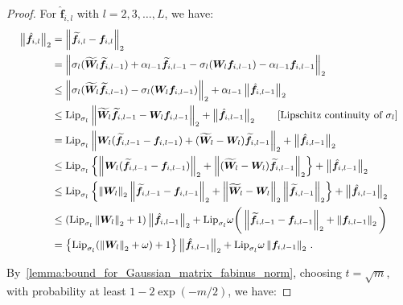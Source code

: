 \documentclass[nohyperref]{article}
\theoremstyle{plain}
\theoremstyle{definition}
\theoremstyle{remark}
\begin{document}
\begin{proof}
For $ \hat{\bm{f}}_{i,l}$ with $l=2,3,\dots,L$, we have:
\begin{equation}
\small
\begin{split}
\left \| \hat{\bm{f}}_{i,l} \right \| _2 & = \left \| \widetilde{\bm{f}}_{i,l} - \bm{f}_{i,l} \right \| _2\\
& = \left \| \sigma_{l}(\widetilde{\bm{W}}_l\widetilde{\bm{f}}_{i,l-1}) + \alpha_{l-1}\widetilde{\bm{f}}_{i,l-1} - \sigma_{l}(\bm{W}_l\bm{f}_{i,l-1})-\alpha_{l-1}\bm{f}_{i,l-1} \right \| _2\\
& \leq \left \| \sigma_{l}(\widetilde{\bm{W}}_l\widetilde{\bm{f}}_{i,l-1}) - \sigma_{l}(\bm{W}_l\bm{f}_{i,l-1}) \right \| _2 + \alpha_{l-1}\left \| \hat{\bm{f}}_{i,l-1} \right \| _2\\ & \leq \mathrm{Lip}_{\sigma_{l}}\left \| \widetilde{\bm{W}}_l\widetilde{\bm{f}}_{i,l-1} - \bm{W}_l\bm{f}_{i,l-1} \right \| _2 + \left \| \hat{\bm{f}}_{i,l-1} \right \| _2\quad\quad\text{[Lipschitz continuity of $\sigma_{l}$]}\\
& = \mathrm{Lip}_{\sigma_{l}}\left \| \bm{W}_l(\widetilde{\bm{f}}_{i,l-1} - \bm{f}_{i,l-1})+(\widetilde{\bm{W}}_l-\bm{W}_l)\widetilde{\bm{f}}_{i,l-1} \right \| _2 + \left \| \hat{\bm{f}}_{i,l-1} \right \| _2\\
& \leq \mathrm{Lip}_{\sigma_{l}}\left\{\left \| \bm{W}_l(\widetilde{\bm{f}}_{i,l-1} - \bm{f}_{i,l-1})\right \| _2+\left \| (\widetilde{\bm{W}}_l-\bm{W}_l)\widetilde{\bm{f}}_{i,l-1} \right \| _2\right\} + \left \| \hat{\bm{f}}_{i,l-1} \right \| _2\\ & \leq \mathrm{Lip}_{\sigma_{l}}\left\{\left \| \bm{W}_l\right \| _2 \left \|\widetilde{\bm{f}}_{i,l-1} - \bm{f}_{i,l-1}\right \|_2+\left \| \widetilde{\bm{W}}_l-\bm{W}_l\right \| _2 \left \|\widetilde{\bm{f}}_{i,l-1} \right \| _2\right\} + \left \| \hat{\bm{f}}_{i,l-1} \right \| _2\\& \leq (\mathrm{Lip}_{\sigma_{l}}\left \| \bm{W}_l\right \| _2+1) \left \|\hat{\bm{f}}_{i,l-1}\right \|_2+\mathrm{Lip}_{\sigma_{l}}\omega\bigg  (\left \|\widetilde{\bm{f}}_{i,l-1} - \bm{f}_{i,l-1}\right \| _2 + \left \| \bm{f}_{i,l-1}\right \| _2\bigg)\\& = \left\{\mathrm{Lip}_{\sigma_{l}}(\left \| \bm{W}_l\right \| _2+\omega)+1\right\} \left \|\hat{\bm{f}}_{i,l-1}\right \|_2+\mathrm{Lip}_{\sigma_{l}}\omega \left \| \bm{f}_{i,l-1}\right \| _2\,.
\end{split}
\label{eq:bound_for_perturbation_2}
\end{equation}

By~\cref{lemma:bound_for_Gaussian_matrix_fabinus_norm}, choosing $t = \sqrt{m}$, with probability at least $1-2\exp(-m/2)$, we have:


\end{proof}
\end{document}
